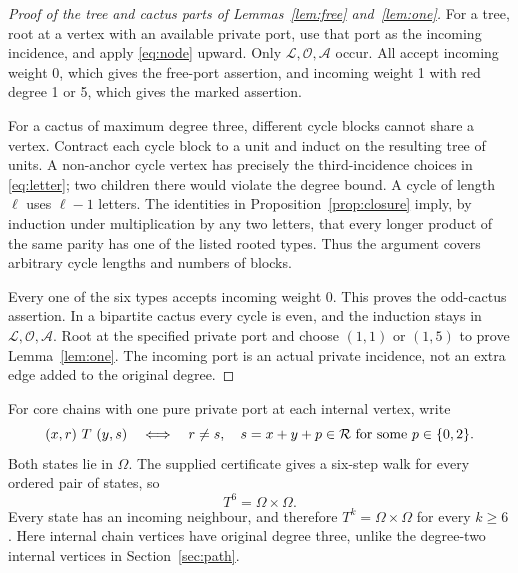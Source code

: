 \begin{proof}[Proof of the tree and cactus parts of Lemmas~\ref{lem:free}
and~\ref{lem:one}]
For a tree, root at a vertex with an available private port, use that
port as the incoming incidence, and apply \eqref{eq:node} upward.
Only $\mathcal L,\mathcal O,\mathcal A$ occur.  All accept incoming
weight 0, which gives the free-port assertion, and incoming weight 1
with red degree 1 or 5, which gives the marked assertion.

For a cactus of maximum degree three, different cycle blocks cannot
share a vertex.  Contract each cycle block to a unit and induct on the
resulting tree of units.  A non-anchor cycle vertex has precisely the
third-incidence choices in \eqref{eq:letter}; two children there would
violate the degree bound.  A cycle of length $\ell$ uses $\ell-1$
letters.  The identities in Proposition~\ref{prop:closure} imply, by
induction under multiplication by any two letters, that every longer
product of the same parity has one of the listed rooted types.
Thus the argument covers arbitrary cycle lengths and numbers of blocks.

Every one of the six types accepts incoming weight 0.  This proves the
odd-cactus assertion.  In a bipartite cactus every cycle is even, and
the induction stays in $\mathcal L,\mathcal O,\mathcal A$.  Root at the
specified private port and choose $(1,1)$ or $(1,5)$ to prove
Lemma~\ref{lem:one}.  The incoming port is an actual private incidence,
not an extra edge added to the original degree.
\end{proof}

For core chains with one pure private port at each internal vertex,
write
\begin{equation}\label{eq:T}
 (x,r)\ T\ (y,s)\quad\Longleftrightarrow\quad
 r\ne s,\quad s=x+y+p\in\mathcal R\text{ for some }p\in\{0,2\}.
\end{equation}
Both states lie in $\Omega$.  The supplied certificate gives a six-step
walk for every ordered pair of states, so
\begin{equation}\label{eq:sat}
 T^6=\Omega\times\Omega.
\end{equation}
Every state has an incoming neighbour, and therefore
$T^k=\Omega\times\Omega$ for every $k\ge6$.
Here internal chain vertices have original degree three, unlike the
degree-two internal vertices in Section~\ref{sec:path}.

